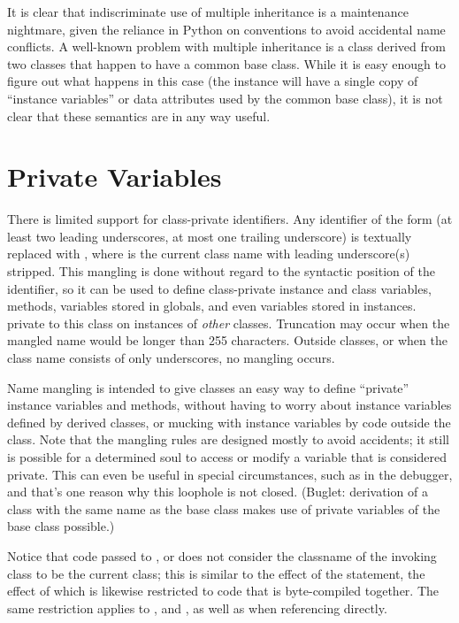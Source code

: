 \documentclass{manual}
\begin{document}
It is clear that indiscriminate use of multiple inheritance is a
maintenance nightmare, given the reliance in Python on conventions to
avoid accidental name conflicts.  A well-known problem with multiple
inheritance is a class derived from two classes that happen to have a
common base class.  While it is easy enough to figure out what happens
in this case (the instance will have a single copy of ``instance
variables'' or data attributes used by the common base class), it is
not clear that these semantics are in any way useful.


\section{Private Variables \label{private}}

There is limited support for class-private
identifiers.  Any identifier of the form  (at least two
leading underscores, at most one trailing underscore) is textually
replaced with , where  is the
current class name with leading underscore(s) stripped.  This mangling
is done without regard to the syntactic position of the identifier, so
it can be used to define class-private instance and class variables,
methods, variables stored in globals, and even variables stored in instances.
private to this class on instances of \emph{other} classes.  Truncation
may occur when the mangled name would be longer than 255 characters.
Outside classes, or when the class name consists of only underscores,
no mangling occurs.

Name mangling is intended to give classes an easy way to define
``private'' instance variables and methods, without having to worry
about instance variables defined by derived classes, or mucking with
instance variables by code outside the class.  Note that the mangling
rules are designed mostly to avoid accidents; it still is possible for
a determined soul to access or modify a variable that is considered
private.  This can even be useful in special circumstances, such as in
the debugger, and that's one reason why this loophole is not closed.
(Buglet: derivation of a class with the same name as the base class
makes use of private variables of the base class possible.)

Notice that code passed to ,  or
 does not consider the classname of the invoking 
class to be the current class; this is similar to the effect of the 
 statement, the effect of which is likewise restricted to 
code that is byte-compiled together.  The same restriction applies to
,  and , as well as
when referencing  directly.
\end{document}
